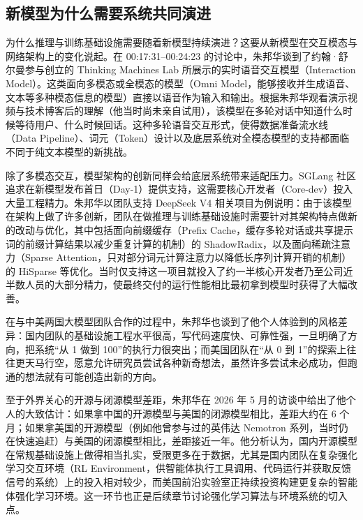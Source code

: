 \documentclass[UTF8,a4paper,11pt,fontset=fandol]{ctexart}
\begin{document}
\subsection{新模型为什么需要系统共同演进}
为什么推理与训练基础设施需要随着新模型持续演进？这要从新模型在交互模态与网络架构上的变化说起。在 00:17:31–00:24:23 的讨论中，朱邦华谈到了约翰·舒尔曼参与创立的 Thinking Machines Lab 所展示的实时语音交互模型（Interaction Model）。这类面向多模态或全模态的模型（Omni Model，能够接收并生成语音、文本等多种模态信息的模型）直接以语音作为输入和输出。根据朱邦华观看演示视频与技术博客后的理解（他当时尚未亲自试用），该模型在多轮对话中知道什么时候等待用户、什么时候回话。这种多轮语音交互形式，使得数据准备流水线（Data Pipeline）、词元（Token）设计以及底层系统对全模态模型的支持都面临不同于纯文本模型的新挑战。

除了多模态交互，模型架构的创新同样会给底层系统带来适配压力。SGLang 社区追求在新模型发布首日（Day-1）提供支持，这需要核心开发者（Core-dev）投入大量工程精力。朱邦华以团队支持 DeepSeek V4 相关项目为例说明：由于该模型在架构上做了许多创新，团队在做推理与训练基础设施时需要针对其架构特点做新的改动与优化，其中包括面向前缀缓存（Prefix Cache，缓存多轮对话或共享提示词的前缀计算结果以减少重复计算的机制）的 ShadowRadix，以及面向稀疏注意力（Sparse Attention，只对部分词元计算注意力以降低长序列计算开销的机制）的 HiSparse 等优化。当时仅支持这一项目就投入了约一半核心开发者乃至公司近半数人员的大部分精力，使最终交付的运行性能相比最初拿到模型时获得了大幅改善。

在与中美两国大模型团队合作的过程中，朱邦华也谈到了他个人体验到的风格差异：国内团队的基础设施工程水平很高，写代码速度快、可靠性强，一旦明确了方向，把系统“从 1 做到 100”的执行力很突出；而美国团队在“从 0 到 1”的探索上往往更天马行空，愿意允许研究员尝试各种新奇想法，虽然许多尝试未必成功，但跑通的想法就有可能创造出新的方向。

至于外界关心的开源与闭源模型差距，朱邦华在 2026 年 5 月的访谈中给出了他个人的大致估计：如果拿中国的开源模型与美国的闭源模型相比，差距大约在 6 个月；如果拿美国的开源模型（例如他曾参与过的英伟达 Nemotron 系列，当时仍在快速追赶）与美国的闭源模型相比，差距接近一年。他分析认为，国内开源模型在常规基础设施上做得相当扎实，受限更多在于数据，尤其是国内团队在复杂强化学习交互环境（RL Environment，供智能体执行工具调用、代码运行并获取反馈信号的系统）上的投入相对较少，而美国前沿实验室正持续投资构建更复杂的智能体强化学习环境。这一环节也正是后续章节讨论强化学习算法与环境系统的切入点。
\end{document}
